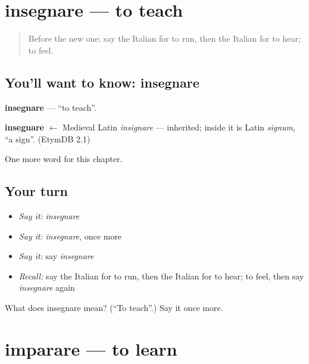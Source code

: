\section[insegnare]{insegnare — to teach}

\label{lesson:IT-C49-insegnare}



\begin{quote}
Before the new one: say the Italian for to run, then the Italian for to hear; to feel.
\end{quote}

\subsection*{You'll want to know: insegnare}
\textbf{insegnare} — \textquotedblleft{}to teach\textquotedblright{}.

\begin{cousinweb}
\textbf{insegnare} $\leftarrow$ Medieval Latin \emph{insignare} — inherited; inside it is Latin \emph{signum}, \textquotedblleft{}a sign\textquotedblright{}. (EtymDB 2.1)
\end{cousinweb}

\begin{grammarlens}[title={What you've built}]
One more word for this chapter.
\end{grammarlens}

\subsection*{Your turn}
\begin{itemize}
\raggedright
  \item \emph{Say it:} \emph{insegnare}
  \item \emph{Say it:} \emph{insegnare}, once more
  \item \emph{Say it:} say \emph{insegnare}
  \item \emph{Recall:} say the Italian for to run, then the Italian for to hear; to feel, then say \emph{insegnare} again
\end{itemize}

\begin{tcolorbox}[breakable,colback=teal!4,colframe=teal!35!black,title={Before you move on}]
What does insegnare mean? (\textquotedblleft{}To teach\textquotedblright{}.) Say it once more.
\end{tcolorbox}
\section[imparare]{imparare — to learn}

